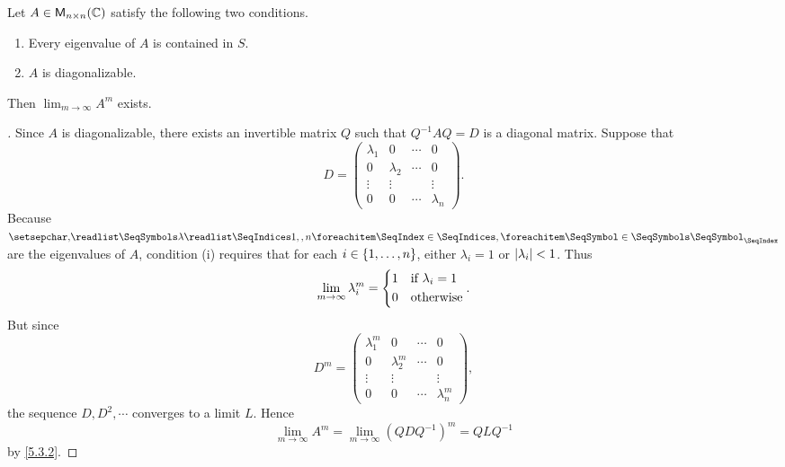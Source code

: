 \begin{thm}\label{5.14}
  Let \(A \in \mathsf{M}_{{n} \times n}({\mathbb{C}})\) satisfy the following two conditions.
  \begin{enumerate}
    \item Every eigenvalue of \(A\) is contained in \(S\).
    \item \(A\) is diagonalizable.
  \end{enumerate}
  Then \(\lim_{m \to \infty} A^m\) exists.
\end{thm}

\begin{proof}[]
  Since \(A\) is diagonalizable, there exists an invertible matrix \(Q\) such that \(Q^{-1} A Q = D\) is a diagonal matrix.
  Suppose that
  \[
    D = \begin{pmatrix}
      \lambda_1 & 0         & \cdots & 0         \\
      0         & \lambda_2 & \cdots & 0         \\
      \vdots    & \vdots    &        & \vdots    \\
      0         & 0         & \cdots & \lambda_n
    \end{pmatrix}.
  \]
  Because \(\seq{\lambda}{1,,n}\) are the eigenvalues of \(A\), condition (i) requires that for each \(i \in \left\lbrace1, \dots, n\right\rbrace\), either \(\lambda_i = 1\) or \(\left\lvert\lambda_i\right\rvert < 1\).
  Thus
  \[
    \lim_{m \to \infty} \lambda_i^m = \begin{dcases}
      1 & \text{if } \lambda_i = 1 \\
      0 & \text{otherwise}
    \end{dcases}.
  \]
  But since
  \[
    D^m = \begin{pmatrix}
      \lambda_1^m & 0           & \cdots & 0           \\
      0           & \lambda_2^m & \cdots & 0           \\
      \vdots      & \vdots      &        & \vdots      \\
      0           & 0           & \cdots & \lambda_n^m
    \end{pmatrix},
  \]
  the sequence \(D, D^2, \cdots\) converges to a limit \(L\).
  Hence
  \[
    \lim_{m \to \infty} A^m = \lim_{m \to \infty} (Q D Q^{-1})^m = Q L Q^{-1}
  \]
  by \cref{5.3.2}.
\end{proof}

